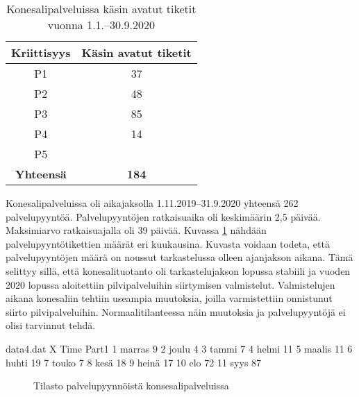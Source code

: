 \begin{table}[ht]
\centering
\begin{tabular}{||c c||} 
 \hline
 Kriittisyys & Käsin avatut tiketit \\ [0.5ex] 
 \hline\hline
 P1 & 37 \\ 
 P2 & 48 \\
 P3 & 85 \\
 P4 & 14 \\
 P5 &  \\
 \textbf{Yhteensä} & \textbf{184} \\ [1ex] 
 \hline
\end{tabular}
\caption{Konesalipalveluissa käsin avatut tiketit vuonna 1.1.--30.9.2020}
\label{table:koneautomaatti}
\end{table}

Konesalipalveluissa oli aikajaksolla 1.11.2019--31.9.2020 yhteensä 262 palvelupyyntöä. Palvelupyyntöjen ratkaisuaika oli keskimäärin 2,5 päivää. Maksimiarvo ratkaisuajalla oli 39 päivää. Kuvassa \ref{fig:konepyynto} nähdään palvelupyyntötikettien määrät eri kuukausina. Kuvasta voidaan todeta, että palvelupyyntöjen määrä on noussut tarkastelussa olleen ajanjakson aikana. Tämä selittyy sillä, että konesalituotanto oli tarkastelujakson lopussa stabiili ja vuoden 2020 lopussa aloitettiin pilvipalveluihin siirtymisen valmistelut. Valmistelujen aikana konesaliin tehtiin useampia muutoksia, joilla varmistettiin onnistunut siirto pilvipalveluihin. Normaalitilanteessa näin muutoksia ja palvelupyyntöjä ei olisi tarvinnut tehdä.

\begin{filecontents}{data4.dat}
X Time  	Part1
1 marras  	9
2 joulu		4
3 tammi 	7
4 helmi		11
5 maalis	11
6 huhti		19
7 touko		7
8 kesä      18
9 heinä     17
10 elo      72
11 syys     87
\end{filecontents}

\begin{figure}[ht]
\caption{Tilasto palvelupyynnöistä konsesalipalveluissa}
\label{fig:konepyynto}
\end{figure}

